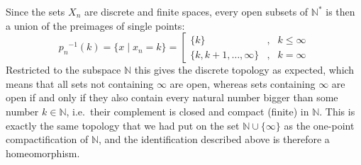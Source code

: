 \documentclass{notes}
\begin{document}
{  Since the sets $X_n$ are discrete and finite spaces, every open subsets of $\mathbb N^*$ is then a union of the preimages of single points:
  \[
      {p_n}^{-1}(k) = \{ x \mid x_n = k \} =
    \left[
    \begin{array}{lll}
      \{ k \}
      & ,
      & k \leq \infty
      \\  \{ k, k+1, \dots, \infty\}
      & ,
      & k = \infty
    \end{array}
    \right.
  \]
  Restricted to the subspace $\mathbb N$ this gives the discrete topology as expected, which means that all sets not containing $\infty$ are open, whereas sets containing $\infty$ are open if and only if they also contain every natural number bigger than some number $k \in \mathbb N$, i.e.\ their complement is closed and compact (finite) in $\mathbb N$.
This is exactly the same topology that we had put on the set $\mathbb N \cup \{\infty\}$ as the one-point compactification of $\mathbb N$, and the identification described above is therefore a homeomorphism.

}\label{subsec:light-profinite-sets}
\end{document}
